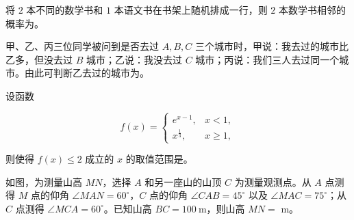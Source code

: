 \begin{question}
将 $2$ 本不同的数学书和 $1$ 本语文书在书架上随机排成一行，则 $2$ 本数学书相邻的概率为\gkblank{}。

\end{question}
\begin{question}
甲、乙、丙三位同学被问到是否去过 $A,B,C$ 三个城市时，甲说：我去过的城市比乙多，但没去过 $B$ 城市；乙说：我没去过 $C$ 城市；丙说：我们三人去过同一个城市。由此可判断乙去过的城市为\gkblank{}。

\end{question}
\begin{question}
设函数

\nopagebreak[4]
\[
f(x)=\begin{cases}
e^{x-1},&x<1,\\
x^{\frac13},&x\geqslant1,
\end{cases}
\]

则使得 $f(x)\leqslant2$ 成立的 $x$ 的取值范围是\gkblank{}。

\Needspace{0.4\textheight}
\end{question}
\begin{question}
如图，为测量山高 $MN$，选择 $A$ 和另一座山的山顶 $C$ 为测量观测点。从 $A$ 点测得 $M$ 点的仰角 $\angle MAN=60^\circ$，$C$ 点的仰角 $\angle CAB=45^\circ$ 以及 $\angle MAC=75^\circ$；从 $C$ 点测得 $\angle MCA=60^\circ$。已知山高 $BC=100\ \mathrm m$，则山高 $MN=$\gkblank{} $\mathrm m$。
\nopagebreak[4]
\begin{center}\end{center}
\nopagebreak[4]
\end{question}

